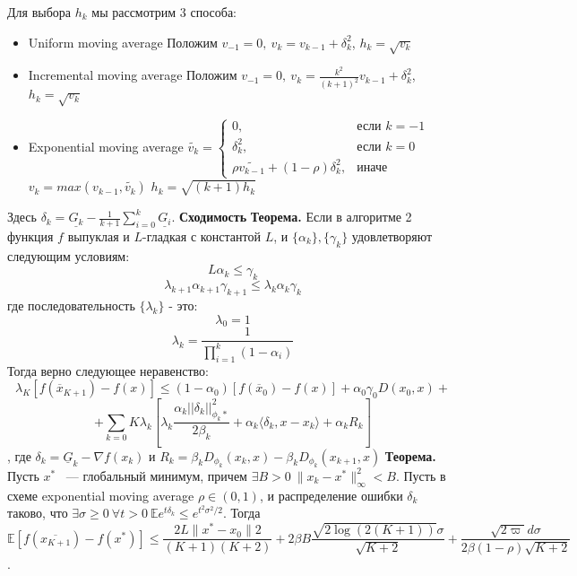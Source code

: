 \documentclass[oneside,final,12pt]{article}
\begin{document}
Для выбора $h_k$ мы рассмотрим 3 способа:\newline
\begin{itemize}
    \item Uniform moving average\newline
    Положим $v_{-1} = 0,\ v_k = v_{k - 1} + \delta_k^2$, $h_k = \sqrt{v_k}$
    \item Incremental moving average\newline
    Положим $v_{-1} = 0,\ v_k = \frac{k^2}{(k+1)^2}v_{k-1} + \delta_k^2$, $h_k = \sqrt{v_k}$
    \item Exponential moving average\newline
    $\widetilde{v_k} = \begin{cases}
    0,& \text{если } k = -1\\
    \delta_k^2,& \text{если } k = 0\\
    \rho\widetilde{v_{k-1}} + (1 - \rho)\delta_k^2,& \text{иначе}
    \end{cases}$\newline
    $v_k = max(v_{k - 1}, \widetilde{v_k})$\newline
    $h_k = \sqrt{(k + 1)h_k}$
\end{itemize}
Здесь $\delta_k = \underline{G_k} - \frac{1}{k+1}\sum\limits_{i=0}^k\underline{G_i}$.\newline
\break\noindent\textbf{\Large{Сходимость}}\newline
\newline\textbf{Теорема.}
Если в алгоритме 2 функция $f$ выпуклая и $L$-гладкая с константой $L$, и $\{\alpha_k\}, \{\gamma_k\}$ удовлетворяют следующим условиям:
$$
L\alpha_k \leq \gamma_k
$$$$
\lambda_{k + 1} \alpha_{k + 1}\gamma_{k + 1} \leq \lambda_k \alpha_k \gamma_k
$$
где последовательность $\{\lambda_k\}$ - это:
$$
\lambda_0 = 1
$$$$
\lambda_k = \frac{1}{\prod_{i = 1}^k(1 - \alpha_i)}
$$
Тогда верно следующее неравенство:
$$
\lambda_K \left[ f(\overline{x}_{K + 1}) - f(x)\right] \leq (1 - \alpha_0) \left[ 
f(\overline{x}_0) - f(x)
\right] + \alpha_0 \gamma_0 D(x_0, x) + 
$$
$$+\sum_{k = 0}K \lambda_k \left[
\lambda_k\frac{\alpha_k||\delta_k||^2_{\phi_k*}}{2\beta_k} + \alpha_k \langle \delta_k, x - x_k \rangle + \alpha_k R_k
\right]
$$, где $\delta_k = \underline{G}_k - \nabla f(x_k)$ и $R_k = \beta_k D_{\phi_k}(x_k, x) - \beta_k D_{\phi_k}(x_{k + 1}, x)$
\newline
\textbf{Теорема.}
Пусть $x^*$ ~--- глобальный минимум, причем $\exists B > 0\ \|x_k - x^*\|^2_\infty < B$. Пусть в схеме exponential moving average $\rho\in(0, 1)$, и распределение ошибки $\delta_k$ таково, что $\exists\sigma \ge 0\ \forall t > 0\ \mathbb{E}e^{t\delta_k}\le e^{t^2\sigma^2/2}$. Тогда $$\mathbb{E}[f(\overline{x_{K+1}}) - f(x^*)] \le \frac{2L\|x^* - x_0\|2}{(K + 1)(K + 2)} + 2\beta B\frac{\sqrt{2\log(2(K + 1))}\sigma}{\sqrt{K + 2}} + \frac{\sqrt{2\varpi}d\sigma}{2\beta(1 - \rho)\sqrt{K + 2}}$$.\newline
\end{document}

